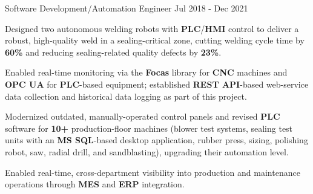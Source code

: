 \begin{cventries}
  \cventry
    {Software Development/Automation Engineer} %
    {} %
    {} %
    {Jul 2018 - Dec 2021} %
    {
      \begin{cvitems} %
        \item {Designed two autonomous welding robots with \textbf{PLC}/\textbf{HMI} control to deliver a robust, high-quality weld in a sealing-critical zone, cutting welding cycle time by \textbf{60\%} and reducing sealing-related quality defects by \textbf{23\%}.}
        \item {Enabled real-time monitoring via the \textbf{Focas} library for \textbf{CNC} machines and \textbf{OPC UA} for \textbf{PLC}-based equipment; established \textbf{REST API}-based web-service data collection and historical data logging as part of this project.}
        \item {Modernized outdated, manually-operated control panels and revised \textbf{PLC} software for \textbf{10+} production-floor machines (blower test systems, sealing test units with an \textbf{MS SQL}-based desktop application, rubber press, sizing, polishing robot, saw, radial drill, and sandblasting), upgrading their automation level.}
        \item {Enabled real-time, cross-department visibility into production and maintenance operations through \textbf{MES} and \textbf{ERP} integration.}
      \end{cvitems}
    }

\end{cventries}


\vspace{-3mm}


